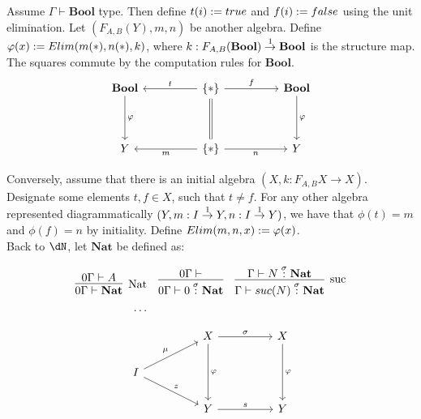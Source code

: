 \documentclass[12pt,a4paper]{article}
\begin{document}
Assume $\Gamma \vdash \mathbf{Bool}$ type. Then define $t(i) := true$ and $f(i) := false$ using the unit elimination.
Let $(F_{A,B}(Y), m, n)$ be another algebra. Define $\varphi(x) := Elim(m(*), n(*), k)$, where $k : F_{A,B}(\mathbf{Bool}) \overset{1}{\to} \mathbf{Bool}$ is the structure map. The squares commute by the computation rules for $\mathbf{Bool}$.
$$\begin{tikzcd}
  \mathbf{Bool} \arrow[dd, "\phi"] &  & \{*\} \arrow[ll, "t"'] \arrow[rr, "f"] \arrow[dd, equal] &  & \mathbf{Bool} \arrow[dd, "\phi"] \\
  &  &                                                               &  &                                  \\
  Y                                &  & \{*\} \arrow[ll, "m"] \arrow[rr, "n"']                        &  & Y                               
\end{tikzcd}$$

Conversely, assume that there is an initial algebra $(X, k : F_{A,B}{X} \to X)$. Designate some elements $t,f \in X$, such that $t \neq f$. For any other algebra represented diagrammatically $(Y, m : I \overset{1}{\to} Y,  n : I \overset{1}{\to} Y)$, we have that $\phi(t) = m$ and $\phi(f) = n$ by initiality. Define $Elim(m, n, x) := \varphi(x)$.\\


Back to $\dN$, let $\mathbf{Nat}$ be defined as:
\begin{figure}[h]
  \begin{gather*}
    \begin{align*}
      \infer[\text{Nat}]{0\Gamma \vdash \mathbf{Nat}}{
        0\Gamma \vdash A
      } & & 
      \infer{0\Gamma \vdash 0 \of{\sigma} \mathbf{Nat}}
      { 0\Gamma \vdash
      }
      & &
      \infer[\text{suc}]{\Gamma \vdash suc(N) \of{\sigma} \mathbf{Nat}}{
        \Gamma \vdash N \of{\sigma} \mathbf{Nat}
      }\\
    \dots
    \end{align*}
  \end{gather*}
\end{figure}

$$
\begin{tikzcd}
  &  & X \arrow[dd, "\phi"] \arrow[rr, "\sigma"] &  & X \arrow[dd, "\phi"] \\
  I \arrow[rru, "\mu"] \arrow[rrd, "z"] &  &                                           &  &                      \\
  &  & Y \arrow[rr, "s"]                         &  & Y                   
\end{tikzcd}$$
\end{document}
